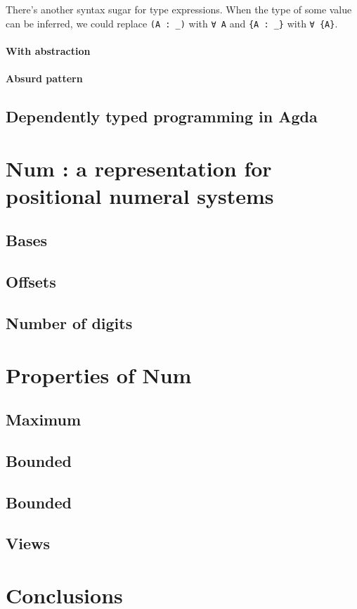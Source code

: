 \documentclass[12pt, a4paper]{article}
\begin{document}
There's another syntax sugar for type expressions. When the type of some value
can be inferred, we could replace {\lstinline|(A : _)|} with {\lstinline|∀ A|} and
 {\lstinline|{A : _}|} with {\lstinline|∀ {A}|}.



\paragraph{With abstraction}

\paragraph{Absurd pattern}


\subsection{Dependently typed programming in Agda}


\section{Num : a representation for positional numeral systems}\label{representation}

\subsection{Bases}
\subsection{Offsets}
\subsection{Number of digits}

\section{Properties of Num}
\subsection{Maximum}
\subsection{Bounded}
\subsection{Bounded}
\subsection{Views}

\section{Conclusions}\label{conclusions}



\end{document}
